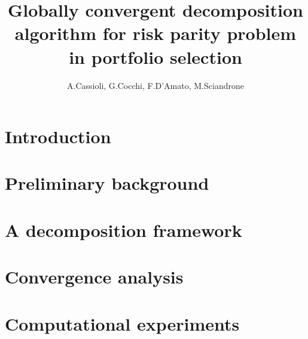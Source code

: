 \documentclass{article}[11pt]
\title{Globally convergent decomposition algorithm for risk parity problem in portfolio selection}
\author{A.Cassioli, G.Cocchi, F.D'Amato, M.Sciandrone}
\begin{document}
\maketitle 
\section{Introduction}


\section{Preliminary background}


\section{A decomposition framework}


\section{Convergence analysis}


\section{Computational experiments}

\end{document}
